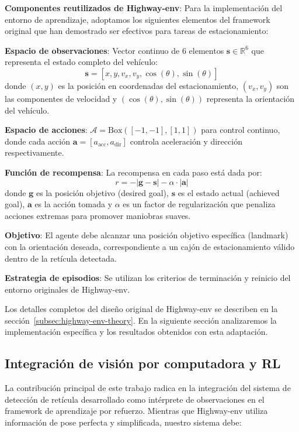 \textbf{Componentes reutilizados de Highway-env}: Para la implementación del entorno de aprendizaje, 
adoptamos los siguientes elementos del framework original que han demostrado ser efectivos para 
tareas de estacionamiento:

\textbf{Espacio de observaciones}: Vector continuo de 6 elementos $\mathbf{s} \in \mathbb{R}^6$ que representa
el estado completo del vehículo:
\begin{equation}
\mathbf{s} = [x, y, v_x, v_y, \cos(\theta), \sin(\theta)]
\end{equation}
donde $(x, y)$ es la posición en coordenadas del estacionamiento, $(v_x, v_y)$ son las componentes 
de velocidad y $(\cos(\theta), \sin(\theta))$ representa la orientación del vehículo.

\textbf{Espacio de acciones}: $\mathcal{A} = \text{Box}([-1, -1], [1, 1])$ para control continuo, 
donde cada acción $\mathbf{a} = [a_{\text{acc}}, a_{\text{dir}}]$ controla aceleración y dirección 
respectivamente.

\textbf{Función de recompensa}: La recompensa en cada paso está dada por:
\begin{equation}
r = -|\mathbf{g} - \mathbf{s}| - \alpha \cdot |\mathbf{a}|
\end{equation}
donde $\mathbf{g}$ es la posición objetivo (desired goal), $\mathbf{s}$ es el estado actual 
(achieved goal), $\mathbf{a}$ es la acción tomada y $\alpha$ es un factor de regularización 
que penaliza acciones extremas para promover maniobras suaves.

\textbf{Objetivo}: El agente debe alcanzar una posición objetivo específica (landmark) con la 
orientación deseada, correspondiente a un cajón de estacionamiento válido dentro de la retícula detectada.

\textbf{Estrategia de episodios}: Se utilizan los criterios de terminación y reinicio del entorno 
originales de Highway-env.


Los detalles completos del diseño original de Highway-env se describen en la
sección~\ref{subsec:highway-env-theory}. En la siguiente sección analizaremos
la implementación específica y los resultados obtenidos con esta adaptación.

\subsection{Integración de visión por computadora y RL}\label{subsec:rl-integration}

La contribución principal de este trabajo radica en la integración del sistema de
detección de retícula desarrollado como intérprete de observaciones en el framework
de aprendizaje por refuerzo. Mientras que Highway-env utiliza información de pose
perfecta y simplificada, nuestro sistema debe:

